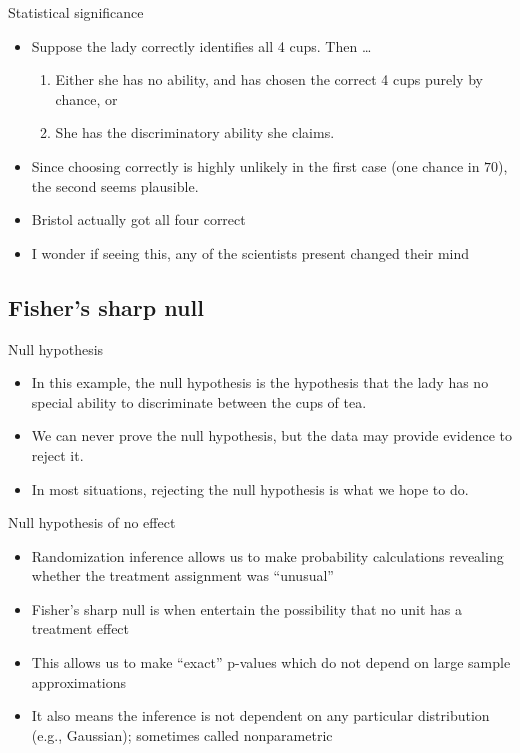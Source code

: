 \documentclass{beamer}
\begin{document}
\begin{frame}{Statistical significance}
	
	\begin{itemize}
	\item Suppose the lady correctly identifies all 4 cups.  Then \dots
		\begin{enumerate}
		\item Either she has no ability, and has chosen the correct 4 cups purely by chance, or
		\item She has the discriminatory ability she claims.
		\end{enumerate}
	\item Since choosing correctly is highly unlikely in the first case (one chance in $70$), the second seems plausible.
	\item Bristol actually got all four correct
	\item I wonder if seeing this, any of the scientists present changed their mind
	\end{itemize}
\end{frame}

\subsection{Fisher's sharp null}

\begin{frame}{Null hypothesis}
	
	\begin{itemize}
	\item In this example, the null hypothesis is the hypothesis that the lady has no special ability to discriminate between the cups of tea.
	\item We can never prove the null hypothesis, but the data may provide evidence to reject it.
	\item In most situations, rejecting the null hypothesis is what we hope to do.

	\end{itemize}
\end{frame}



\begin{frame}{Null hypothesis of no effect}

\begin{itemize}
\item Randomization inference allows us to make probability calculations revealing whether the treatment assignment was ``unusual''
\item Fisher's sharp null is when entertain the possibility that no unit has a treatment effect
\item This allows us to make ``exact'' p-values which do not depend on large sample approximations
\item It also means the inference is not dependent on any particular distribution (e.g., Gaussian); sometimes called nonparametric
\end{itemize}

\end{frame}
\end{document}
